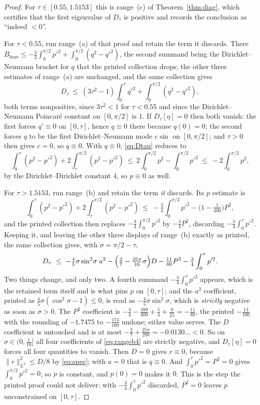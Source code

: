 \documentclass[11pt]{article}
\theoremstyle{definition}
\begin{document}
\begin{proof}
For $\tau\in[0.55,1.5153]$ this is range~(c) of Theorem~\ref{thm:diag}, which certifies that
the first eigenvalue of $D_\tau$ is positive and records the conclusion as ``indeed $<0$''.

For $\tau<0.55$, run range~(a) of that proof and retain the term it discards. There
$B_{\mathrm{bare}}\le-\tfrac32\int_0^{\pi/2}p'^2+\int_0^{\pi/2}(q^2-q'^2)$, the second summand
being the Dirichlet--Neumann bracket for $q$ that the printed collection drops; the other
three estimates of range~(a) are unchanged, and the same collection gives
\[
  D_\tau\ \le\ (3\tau^2-1)\int_0^\tau q'^2+\int_0^{\pi/2}(q^2-q'^2) ,
\]
both terms nonpositive, since $3\tau^2<1$ for $\tau<0.55$ and since the Dirichlet--Neumann
Poincaré constant on $[0,\pi/2]$ is $1$. If $D_\tau[\eta]=0$ then both vanish: the first
forces $q'\equiv0$ on $[0,\tau]$, hence $q\equiv0$ there because $q(0)=0$; the second forces
$q$ to be the first Dirichlet--Neumann mode $c\sin$ on $[0,\pi/2]$; and $\tau>0$ then gives
$c=0$, so $q\equiv0$. With $q\equiv0$, \eqref{eq:Dtau} reduces to
\[
  \int_0^\tau(p^2-p'^2)+2\!\int_\tau^{\pi/2}\!(p^2-p'^2)
  \ \le\ 2\!\int_0^{\pi/2}\!p^2-\int_0^{\pi/2}\!p'^2\ \le\ -2\!\int_0^{\pi/2}\!p^2 ,
\]
by the Dirichlet--Dirichlet constant $4$, so $p\equiv0$ as well.

For $\tau>1.5153$, run range~(b) and retain the term \emph{it} discards. Its $p$ estimate is
\[
  \int_0^\tau(p^2-p'^2)+2\!\int_\tau^{\pi/2}\!(p^2-p'^2)
  \ \le\ -\tfrac34\int_0^{\pi/2}p'^2-\bigl(1-\tfrac1{400}\bigr)P^2 ,
\]
and the printed collection then replaces $-\tfrac34\int_0^{\pi/2}p'^2$ by $-\tfrac34P^2$,
discarding $-\tfrac34\int_0^\tau p'^2$. Keeping it, and leaving the other three displays of
range~(b) exactly as printed, the same collection gives, with $\sigma=\pi/2-\tau$,
\begin{equation}\label{eq:rangeb4}
  D_\tau\ \le\ -\tfrac45\sigma\sin^2\!\sigma\;a^2
   -\Bigl(\tfrac27-\tfrac{25\pi}{16}\sigma\Bigr)D
   -\tfrac{11}{80}P^2-\tfrac34\int_0^\tau p'^2 .
\end{equation}
Two things change, and only two. A fourth summand $-\tfrac34\int_0^\tau p'^2$ appears, which
is the retained term itself and is what pins $p$ on $[0,\tau]$; and the $a^2$ coefficient,
printed as $\tfrac45\sigma(\cos^2\sigma-1)\le0$, is read as
$-\tfrac45\sigma\sin^2\sigma$, which is \emph{strictly} negative as soon as $\sigma>0$. The
$P^2$ coefficient is $-\tfrac34-\tfrac{399}{400}+\tfrac54+\tfrac9{25}=-\tfrac{11}{80}$, the
printed $-\tfrac{13}{100}$ with the rounding of $-1.7475$ to $-\tfrac{174}{100}$ undone;
either value serves. The $D$
coefficient is untouched and is at most $-\tfrac27+\tfrac{25\pi}{288}=-0.0130\ldots<0$. So on
$\sigma\in(0,\tfrac1{18}]$ all four coefficients of \eqref{eq:rangeb4} are strictly negative,
and $D_\tau[\eta]=0$ forces all four quantities to vanish. Then $D=0$ gives $r\equiv0$,
because $\|r\|^2_{L^2}\le D/8$ by \eqref{eq:spec}; with $a=0$ that is $q\equiv0$. And
$\int_0^\tau p'^2=P^2=0$ gives $\int_0^{\pi/2}p'^2=0$, so $p$ is constant, and $p(0)=0$ makes
it $0$. This is the step the printed proof could not deliver: with $-\tfrac34\int_0^\tau p'^2$
discarded, $P^2=0$ leaves $p$ unconstrained on $[0,\tau]$.


\end{proof}
\end{document}
